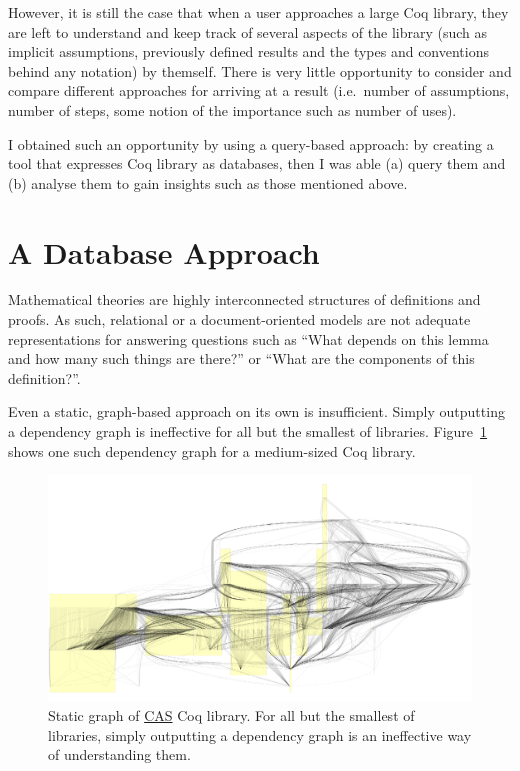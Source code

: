 However, it is still the case that when a user approaches a large Coq library, 
they are left to understand and keep track of several aspects of the
library (such as implicit assumptions, previously defined results and the
types and conventions behind any notation) by themself. There is very little
opportunity to consider and compare different approaches for arriving at a
result (i.e.\ number of assumptions, number of steps, some notion of the
importance such as number of uses).

I obtained such an opportunity by using a query-based approach: by creating a
tool that expresses Coq library as databases, then I was able (a) query them
and (b) analyse them to gain insights such as those mentioned above.

\section{A Database Approach}

Mathematical theories are highly interconnected structures of definitions and
proofs. As such, relational or a document-oriented models are not adequate
representations for answering questions such as ``What depends on this lemma
and how many such things are there?'' or ``What are the components of this
definition?''.

Even a static, graph-based approach on its own is insufficient. Simply
outputting a dependency graph is ineffective for all but the smallest of
libraries. Figure~\ref{fig:static} shows one such dependency graph for a
medium-sized Coq library.

\begin{figure}[tp]

  \centering
  \includegraphics[width=\textwidth, page=1]{img/static-CAS-small.pdf}
  \caption{Static graph of
    \href{https://github.com/Timothy-G-Griffin/CAS}{CAS} Coq library. For all
    but the smallest of libraries, simply outputting a dependency graph is an
    ineffective way of understanding them.}\label{fig:static}

\end{figure}

